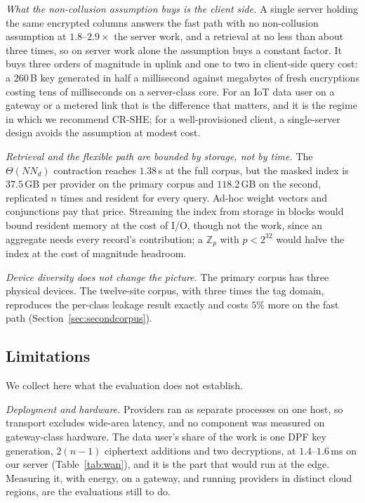 \documentclass[a4paper,fleqn]{cas-sc}
\newif\ifauthorchecks
\newcommand{\authorcheck}[1]{\ifauthorchecks{\color{red}\textsf{[Authors: #1]}}\fi}
\begin{document}
\emph{What the non-collusion assumption buys is the client side.} A single
server holding the same encrypted columns answers the fast path with no
non-collusion assumption at $1.8$--$2.9\times$ the server work, and a
retrieval at no less than about three times, so on server work alone the
assumption buys a constant factor. It buys three orders of magnitude in uplink
and one to two in client-side query cost: a $260$\,B key generated in half a
millisecond against megabytes of fresh encryptions costing tens of
milliseconds on a server-class core. For an IoT data user on a gateway or a
metered link that is the difference that matters, and it is the regime in
which we recommend CR-SHE; for a well-provisioned client, a single-server
design avoids the assumption at modest cost.

\emph{Retrieval and the flexible path are bounded by storage, not by time.}
The $\Theta(N N_d)$ contraction reaches $1.38$\,s at the full corpus, but the
masked index is $37.5$\,GB per provider on the primary corpus and $118.2$\,GB
on the second, replicated $n$ times and resident for every query. Ad-hoc
weight vectors and conjunctions pay that price. Streaming the index from
storage in blocks would bound resident memory at the cost of I/O, though not
the work, since an aggregate needs every record's contribution; a
$\mathbb{Z}_p$ with $p<2^{32}$ would halve the index at the cost of magnitude
headroom.

\emph{Device diversity does not change the picture.} The primary corpus has
three physical devices. The twelve-site corpus, with three times the tag
domain, reproduces the per-class leakage result exactly and costs $5\%$ more
on the fast path (Section~\ref{sec:secondcorpus}).

\subsection{Limitations}
\label{sec:limits}
We collect here what the evaluation does not establish.

\emph{Deployment and hardware.} Providers ran as separate processes on one
host, so transport excludes wide-area latency, and no component was measured
on gateway-class hardware. The data user's share of the work is one DPF key
generation, $2(n-1)$ ciphertext additions and two decryptions, at
$1.4$--$1.6$\,ms on our server (Table~\ref{tab:wan}), and it is the part that
would run at the edge. Measuring it, with energy, on a gateway, and running
providers in distinct cloud regions, are the evaluations still to do.
\authorcheck{Run the deployment with providers in at least two cloud regions
before resubmitting; "premature" most likely refers to this.}
\end{document}
